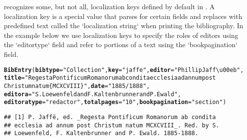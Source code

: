 \documentclass[article]{jss}\usepackage[]{graphicx}\usepackage[]{color}
\makeatletter
\newcommand{\hlstr}[1]{\textcolor[rgb]{0.125,0.125,1}{#1}}%
\newcommand{\hlstd}[1]{\textcolor[rgb]{0.251,0.251,0.282}{#1}}%
\newcommand{\hlkwc}[1]{\textcolor[rgb]{0.529,0,0.184}{\textbf{#1}}}%
\newcommand{\hlkwd}[1]{\textcolor[rgb]{0.251,0.251,0.282}{\textbf{#1}}}%
\newenvironment{kframe}{%
 \def\at@end@of@kframe{}%
 \ifinner\ifhmode%
  \def\at@end@of@kframe{\end{minipage}}%
  \begin{minipage}{\columnwidth}%
 \fi\fi%
 \def\FrameCommand##1{\hskip\@totalleftmargin \hskip-\fboxsep
 \colorbox{shadecolor}{##1}\hskip-\fboxsep
     \hskip-\linewidth \hskip-\@totalleftmargin \hskip\columnwidth}%
 \MakeFramed {\advance\hsize-\width
   \@totalleftmargin\z@ \linewidth\hsize
   \@setminipage}}%
 {\par\unskip\endMakeFramed%
 \at@end@of@kframe}
\newenvironment{knitrout}{}{} %
\newcommand{\ourpkg}{\pkg{RefManageR}}
\makeatother
\begin{document}
\ourpkg{} recognizes some, but not all, localization keys defined by default in \Biblatex{}.  A localization key is a special value that \Biblatex{} parses for certain fields and replaces with predefined text called the `localization string` when printing the bibliography.  In the example below we use localization keys to specify the roles of editors using the `editortype` field and refer to portions of a text using the `bookpagination` field.
\begin{knitrout}
\color{fgcolor}\begin{kframe}
\begin{alltt}
\hlkwd{BibEntry}\hlstd{(}\hlkwc{bibtype}\hlstd{=}\hlstr{"Collection"}\hlstd{,} \hlkwc{key} \hlstd{=} \hlstr{"jaffe"}\hlstd{,} \hlkwc{editor} \hlstd{=} \hlstr{"Phillip Jaff\textbackslash{}u00eb"}\hlstd{,}
  \hlkwc{title} \hlstd{=} \hlstr{"Regesta Pontificum Romanorum ab condita ecclesia ad annum post
  Christum natum \{MCXCVIII\}"}\hlstd{,} \hlkwc{date} \hlstd{=} \hlstr{"1885/1888"}\hlstd{,}
  \hlkwc{editora} \hlstd{=} \hlstr{"S. Loewenfeld and F. Kaltenbrunner and P. Ewald"}\hlstd{,}
  \hlkwc{editoratype} \hlstd{=} \hlstr{"redactor"}\hlstd{,} \hlkwc{totalpages} \hlstd{=} \hlstr{"10"}\hlstd{,} \hlkwc{bookpagination} \hlstd{=} \hlstr{"section"}\hlstd{)}
\end{alltt}
\begin{verbatim}
## [1] P. Jaffë, ed. _Regesta Pontificum Romanorum ab condita
## ecclesia ad annum post Christum natum MCXCVIII_. Red. by S.
## Loewenfeld, F. Kaltenbrunner and P. Ewald. 1885-1888.
\end{verbatim}
\end{kframe}
\end{knitrout}
\end{document}
